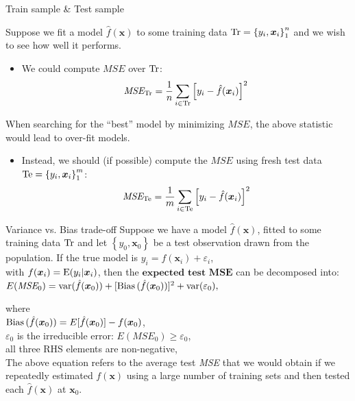 \documentclass{beamer}
\begin{document}
\begin{frame}{Train sample \& Test sample}

Suppose we fit a model $\hat{f}(\bm{x})$ to some training data $\textnormal{Tr}=\left\lbrace y_i, \bm{x}_i \right\rbrace _1 ^n$ and we wish to see how well it performs.

\begin{itemize}
\item We could compute $\textit{MSE}$ over $\textnormal{Tr}$:
$$ \textit{MSE}_{\textnormal{Tr}} = \frac{1}{n}
   \sum_{i \in \textnormal{Tr}}
   \left[y_i - \hat{f}(\bm{x}_i) \right]^2 $$
\end{itemize}

When searching for the ``best'' model by minimizing $ \textit{MSE}$, the above statistic would lead to over-fit models.
\medskip
\begin{itemize}
\item Instead, we should (if possible) compute the $ \textit{MSE}$ using fresh test
data $\textnormal{Te}=\left\lbrace y_i, \bm{x}_i \right\rbrace _1 ^m$:
$$ \textit{MSE}_{\textnormal{Te}} = \frac{1}{m}
    \sum_{i \in \textnormal{Te}}
   \left[y_i - \hat{f}(\bm{x}_i) \right]^2 $$
\end{itemize}
\end{frame}
\begin{frame}{Variance vs. Bias trade-off}
Suppose we have a model $\hat{f}(\bm{x})$, fitted to some training data $\textnormal{Tr}$ and let $\left\lbrace y_0, \bm{x}_0 \right\rbrace$ be a test observation drawn from the population. If the true model is $y_i = f(\bm{x}_i) + \varepsilon_i$, \\ with $f(\bm{x}_i)= \textnormal{E}(y_i | \bm{x}_i )$,
then the $\textbf{expected test MSE}$ can be decomposed into:\\
\medskip
$E(\textit{MSE}_0)
   = \textnormal{var}(\hat{f}(\bm{x}_0))
   + [\textnormal{Bias\,}(\hat{f}(\bm{x}_0))]^2
   + \textnormal{var}(\varepsilon_0),$

where\\
\smallskip
$\textnormal{Bias\,}(\hat{f}(\bm{x}_0)) 
       = E[\hat{f}(\bm{x}_0)]
       - f(\bm{x}_0)$,\\
$\varepsilon_0$ is the irreducible error: $E(\textit{MSE}_0) \geq \varepsilon_0$,\\ 
all three RHS elements are non-negative,\\
\smallskip
The above equation refers to the average test \textit{MSE} that we would obtain if we repeatedly estimated $f(\bm{x})$ using a large number of training sets and then tested each $\hat{f}(\bm{x})$ at $\bm{x}_0$.
\end{frame}
\end{document}
